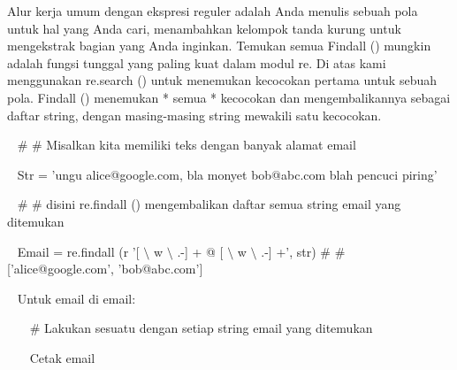 \vspace{12pt}
Alur kerja umum dengan ekspresi reguler adalah Anda menulis sebuah pola untuk hal yang Anda cari, menambahkan kelompok tanda kurung untuk mengekstrak bagian yang Anda inginkan. Temukan semua Findall () mungkin adalah fungsi tunggal yang paling kuat dalam modul re. Di atas kami menggunakan re.search () untuk menemukan kecocokan pertama untuk sebuah pola. Findall () menemukan * semua * kecocokan dan mengembalikannya sebagai daftar string, dengan masing-masing string mewakili satu kecocokan. \par
\vspace{12pt}
\vspace{12pt}
\noindent 
~  $  \#  $ $  \#  $ Misalkan kita memiliki teks dengan banyak alamat email \par
\noindent 
~ Str = 'ungu alice@google.com, bla monyet bob@abc.com blah pencuci piring' \par
\vspace{12pt}
\noindent 
~  $  \#  $ $  \#  $ disini re.findall () mengembalikan daftar semua string email yang ditemukan \par
\noindent 
~ Email = re.findall (r '[ $  \setminus  $ w  $  \setminus  $ .-] + @ [ $  \setminus  $ w  $  \setminus  $ .-] +', str)  $  \#  $ $  \#  $ ['alice@google.com', 'bob@abc.com'] \par
\noindent 
~ Untuk email di email: \par
\noindent 
~~~  $  \#  $ Lakukan sesuatu dengan setiap string email yang ditemukan \par
\noindent 
~~~ Cetak email \par
\vspace{12pt}

